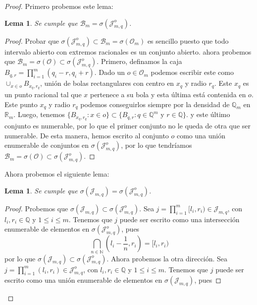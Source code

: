\documentclass{article}
\newtheorem{lemma}[theorem]{Lema}
\theoremstyle{definition}
\theoremstyle{remark}
\newcommand{\BR}{\mathbb R}
\newcommand{\BQ}{\mathbb Q}
\newcommand{\BN}{\mathbb N}
\begin{document}
\begin{proof}
  Primero probemos este lema:
  \begin{lemma}
    Se cumple que $\mathcal{B}_m = \sigma(\mathcal{J}_{m, q}^o)$.
  \end{lemma}
  \begin{proof}
    Probar que $\sigma(\mathcal{J}_{m, q}^o) \subset \mathcal{B}_m = \sigma(\mathcal{O}_m)$
    es sencillo puesto que todo intervalo abierto con extremos racionales es un
    conjunto abierto.
    ahora probemos que $\mathcal{B}_m = \sigma(\mathcal{O}) \subset \sigma(\mathcal{J}_{m, q}^o)$.
    Primero, definamos la caja $B_{q, r} = \prod_{i = 1}^m (q_i - r, q_i + r)$.
    Dado un $o \in \mathcal{O}_m$ podemos escribir este como
    $\cup_{x \in o} B_{x_q, r_q}$, uni\'on de bolas rectangulares con centro en
    $x_q$ y radio $r_q$. Este $x_q$ es un punto racional tal que $x$ pertenece
    a su bola y esta \'ultima est\'a contenida en $o$. Este punto $x_q$ y radio
    $r_q$ podemos conseguirlos siempre por la densidad de $\BQ_m$ en $\BR_m$.
    Luego, tenemos $\{B_{x_q, r_q} : x \in o\} \subset \{B_{q, r} : q \in \BQ^m \text{ y } r \in \BQ\}$.
    y este \'ultimo conjunto es numerable, por lo que el primer conjunto no le queda de otra
    que ser numerable. De esta manera, hemos escrito al conjunto $o$ como una uni\'on enumerable
    de conjuntos en $\sigma(\mathcal{J}_{m, q}^o)$, por lo que tendr\'iamos
    $\mathcal{B}_m = \sigma(\mathcal{O}) \subset \sigma(\mathcal{J}_{m, q}^o)$.
  \end{proof}
  Ahora probemos el siguiente lema:
  \begin{lemma}
    Se cumple que $\sigma(\mathcal{J}_{m, q}) = \sigma(\mathcal{J}_{m, q}^o)$.
  \end{lemma}
  \begin{proof}
    Probemos que $\sigma(\mathcal{J}_{m, q}) \subset \sigma(\mathcal{J}_{m, q}^o)$.
    Sea $j = \prod_{i = 1}^m [l_i, r_i) \in \mathcal{J}_{m, q}$,
    con $l_i, r_i \in \BQ$ y $1 \leq i \leq m$.
    Tenemos que $j$ puede ser escrito como una intersecci\'on enumerable de
    elementos en $\sigma(\mathcal{J}_{m, q}^o)$, pues
    \[
      \bigcap_{n \in \BN} \left(l_i - \frac{1}{n}, r_i\right) = [l_i, r_i)
    \]
    por lo que $\sigma(\mathcal{J}_{m, q}) \subset \sigma(\mathcal{J}_{m, q}^o)$.
    Ahora probemos la otra direcci\'on.
    Sea $j = \prod_{i = 1}^m (l_i, r_i) \in \mathcal{J}_{m, q}^o$,
    con $l_i, r_i \in \BQ$ y $1 \leq i \leq m$.
    Tenemos que $j$ puede ser escrito como una uni\'on enumerable de elementos
    en $\sigma(\mathcal{J}_{m, q})$, pues

\end{proof}
\end{proof}
\end{document}
